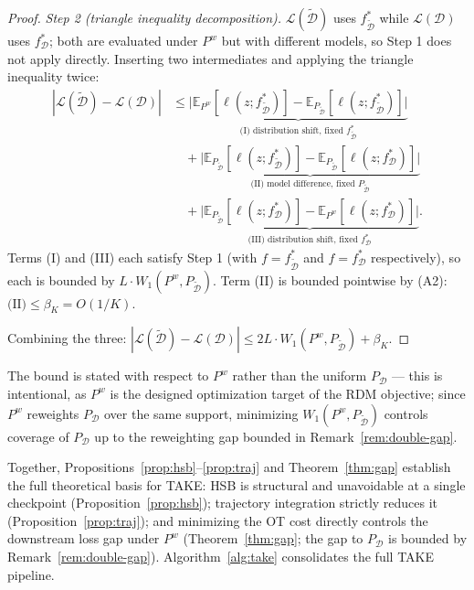 \begin{foldable}
\begin{proof}
    \textit{Step 2 (triangle inequality decomposition).}
    $\mathcal{L}(\tilde{\mathcal{D}})$ uses $f^*_{\tilde{\mathcal{D}}}$ while $\mathcal{L}(\mathcal{D})$ uses $f^*_\mathcal{D}$; both are evaluated under $P^w$ but with different models, so Step 1 does not apply directly.
    Inserting two intermediates and applying the triangle inequality twice:
    \begin{align*}
      |\mathcal{L}(\tilde{\mathcal{D}}) - \mathcal{L}(\mathcal{D})|
      &\leq \underbrace{\bigl|\mathbb{E}_{P^w}[\ell(z;f^*_{\tilde{\mathcal{D}}})] - \mathbb{E}_{P_{\tilde{\mathcal{D}}}}[\ell(z;f^*_{\tilde{\mathcal{D}}})]\bigr|}_{\text{(I) distribution shift, fixed }f^*_{\tilde{\mathcal{D}}}} \\
      &\quad + \underbrace{\bigl|\mathbb{E}_{P_{\tilde{\mathcal{D}}}}[\ell(z;f^*_{\tilde{\mathcal{D}}})] - \mathbb{E}_{P_{\tilde{\mathcal{D}}}}[\ell(z;f^*_\mathcal{D})]\bigr|}_{\text{(II) model difference, fixed }P_{\tilde{\mathcal{D}}}} \\
      &\quad + \underbrace{\bigl|\mathbb{E}_{P_{\tilde{\mathcal{D}}}}[\ell(z;f^*_\mathcal{D})] - \mathbb{E}_{P^w}[\ell(z;f^*_\mathcal{D})]\bigr|}_{\text{(III) distribution shift, fixed }f^*_\mathcal{D}}.
    \end{align*}
    Terms (I) and (III) each satisfy Step 1 (with $f = f^*_{\tilde{\mathcal{D}}}$ and $f = f^*_\mathcal{D}$ respectively), so each is bounded by $L \cdot W_1(P^w, P_{\tilde{\mathcal{D}}})$.
    Term (II) is bounded pointwise by (A2): $\text{(II)} \leq \beta_K = O(1/K)$.

    Combining the three: $|\mathcal{L}(\tilde{\mathcal{D}}) - \mathcal{L}(\mathcal{D})| \leq 2L \cdot W_1(P^w, P_{\tilde{\mathcal{D}}}) + \beta_K$.
  \end{proof}
  The bound is stated with respect to $P^w$ rather than the uniform $P_\mathcal{D}$ --- this is intentional, as $P^w$ is the designed optimization target of the \ac{RDM} objective; since $P^w$ reweights $P_\mathcal{D}$ over the same support, minimizing $W_1(P^w, P_{\tilde{\mathcal{D}}})$ controls coverage of $P_\mathcal{D}$ up to the reweighting gap bounded in Remark~\ref{rem:double-gap}.
\end{foldable}

\begin{foldable} %
  Together, Propositions~\ref{prop:hsb}--\ref{prop:traj} and Theorem~\ref{thm:gap} establish the full theoretical basis for \ac{TAKE}: \ac{HSB} is structural and unavoidable at a single checkpoint (Proposition~\ref{prop:hsb}); trajectory integration strictly reduces it (Proposition~\ref{prop:traj}); and minimizing the \ac{OT} cost directly controls the downstream loss gap under $P^w$ (Theorem~\ref{thm:gap}; the gap to $P_\mathcal{D}$ is bounded by Remark~\ref{rem:double-gap}).
  Algorithm~\ref{alg:take} consolidates the full \ac{TAKE} pipeline.
\end{foldable}

